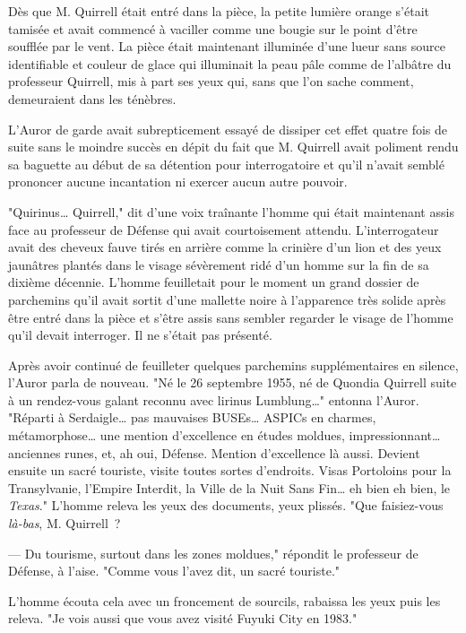 Dès que M. Quirrell était entré dans la pièce, la petite lumière orange s'était tamisée et avait commencé à vaciller comme une bougie sur le point d'être soufflée par le vent. La pièce était maintenant illuminée d'une lueur sans source identifiable et couleur de glace qui illuminait la peau pâle comme de l'albâtre du professeur Quirrell, mis à part ses yeux qui, sans que l'on sache comment, demeuraient dans les ténèbres.

L'Auror de garde avait subrepticement essayé de dissiper cet effet quatre fois de suite sans le moindre succès en dépit du fait que M. Quirrell avait poliment rendu sa baguette au début de sa détention pour interrogatoire et qu'il n'avait semblé prononcer aucune incantation ni exercer aucun autre pouvoir.

"Quirinus… Quirrell," dit d'une voix traînante l'homme qui était maintenant assis face au professeur de Défense qui avait courtoisement attendu. L'interrogateur avait des cheveux fauve tirés en arrière comme la crinière d'un lion et des yeux jaunâtres plantés dans le visage sévèrement ridé d'un homme sur la fin de sa dixième décennie. L'homme feuilletait pour le moment un grand dossier de parchemins qu'il avait sortit d'une mallette noire à l'apparence très solide après être entré dans la pièce et s'être assis sans sembler regarder le visage de l'homme qu'il devait interroger. Il ne s'était pas présenté.

Après avoir continué de feuilleter quelques parchemins supplémentaires en silence, l'Auror parla de nouveau. "Né le 26 septembre 1955, né de Quondia Quirrell suite à un rendez-vous galant reconnu avec lirinus Lumblung…" entonna l'Auror. "Réparti à Serdaigle… pas mauvaises BUSEs… ASPICs en charmes, métamorphose… une mention d'excellence en études moldues, impressionnant… anciennes runes, et, ah oui, Défense. Mention d'excellence là aussi. Devient ensuite un sacré touriste, visite toutes sortes d'endroits. Visas Portoloins pour la Transylvanie, l'Empire Interdit, la Ville de la Nuit Sans Fin… eh bien eh bien, le \emph{Texas}." L'homme releva les yeux des documents, yeux plissés. "Que faisiez-vous \emph{là-bas}, M. Quirrell~?

--- Du tourisme, surtout dans les zones moldues," répondit le professeur de Défense, à l'aise. "Comme vous l'avez dit, un sacré touriste."

L'homme écouta cela avec un froncement de sourcils, rabaissa les yeux puis les releva. "Je vois aussi que vous avez visité Fuyuki City en 1983."

